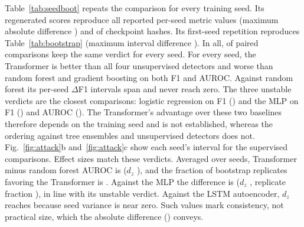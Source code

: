 \documentclass[preprint,12pt,numafflabel]{elsarticle}
\begin{document}
Table~\ref{tab:seedboot} repeats the comparison for every training seed. Its regenerated scores reproduce all \ResSensVerifyValues{} reported per-seed metric values (maximum absolute difference \ResSensVerifyMaxDelta) and \ResSensHashesMatched{} of \ResSensHashesCompared{} checkpoint hashes. Its first-seed repetition reproduces Table~\ref{tab:bootstrap} (maximum interval difference \ResSeedBootFirstSeedDelta). In all, \ResSeedBootStable{} of \ResSeedBootComparisons{} paired comparisons keep the same verdict for every seed. For every seed, the Transformer is better than all four unsupervised detectors and worse than random forest and gradient boosting on both F1 and AUROC. Against random forest its per-seed $\Delta$F1 intervals span \ResSeedBootRandomForestFOneEnvelope{} and never reach zero. The three unstable verdicts are the closest comparisons: logistic regression on F1 (\ResSeedBootLogRegFOneVerdict) and the MLP on F1 (\ResSeedBootMLPFOneVerdict) and AUROC (\ResSeedBootMLPAUROCVerdict). The Transformer's advantage over these two baselines therefore depends on the training seed and is not established, whereas the ordering against tree ensembles and unsupervised detectors does not. Fig.~\ref{fig:attack}b and~\ref{fig:attack}c show each seed's interval for the supervised comparisons. Effect sizes match these verdicts. Averaged over seeds, Transformer minus random forest AUROC is \ResEffRandomForestAUROCDelta{} ($d_z$ \ResEffRandomForestAUROCDZ), and the fraction of bootstrap replicates favoring the Transformer is \ResEffRandomForestAUROCFrac. Against the MLP the difference is \ResEffMLPAUROCDelta{} ($d_z$ \ResEffMLPAUROCDZ, replicate fraction \ResEffMLPAUROCFrac), in line with its unstable verdict. Against the LSTM autoencoder, $d_z$ reaches \ResEffLSTMAEAUROCDZ{} because seed variance is near zero. Such values mark consistency, not practical size, which the absolute difference (\ResEffLSTMAEAUROCDelta) conveys.

\begin{table}
\centering
\caption{Threshold procedures on the official test split: recall and realized FAR (means over \ResSeeds{} training seeds) for thresholds chosen on validation data by maximum F1, Youden's $J$, and the quantile rules that keep the validation non-malicious alert rate within a 1\% or 5\% budget. Seed-wise paired differences against maximum F1 are stored in \texttt{results/loao\_diagnostics.json}. Takeaway: the rule shifts the operating point, most strongly for the unsupervised detectors, and no rule meets a nominal budget on the test split.}
\label{tab:thresholds}
{\scriptsize}
\end{table}
\end{document}
